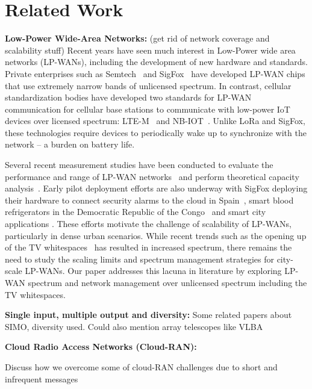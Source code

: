 \section{Related Work}
\label{sec:related-work}



\noindent \textbf{Low-Power Wide-Area Networks: } {\color{blue} (get rid of network coverage and scalability stuff)} Recent years have seen much
interest in Low-Power wide area networks (LP-WANs), including the development
of new hardware and standards. Private enterprises such as
Semtech~\cite{Sornin2015, LoRaWanAlliance2015} and
SigFox~\cite{sanchez2016state} have developed LP-WAN chips that use extremely
narrow bands of unlicensed spectrum. In contrast, cellular standardization
bodies have developed two standards for LP-WAN communication for cellular base
stations to communicate with low-power IoT devices over licensed spectrum:
LTE-M~\cite{GSMAssociation2016} and NB-IOT~\cite{Ratasuk2016}. Unlike LoRa and
SigFox, these technologies require devices to periodically wake up to
synchronize with the network -- a burden on battery life.

Several recent measurement studies have been conducted to evaluate the
performance and range of LP-WAN networks~\cite{petric2016measurements,
7499263, toldov2016performance} and perform theoretical capacity
analysis~\cite{mikhaylov2016analysis}. Early pilot deployment efforts are also
underway with SigFox deploying their hardware to connect security alarms to
the cloud in Spain~\cite{sanchez2016state}, smart blood refrigerators in the
Democratic Republic of the Congo~\cite{ramachandranmupnp} and smart city
applications \cite{centenaro2015long}. These efforts motivate the challenge of
scalability of LP-WANs, particularly in dense urban scenarios. While recent
trends such as the opening up of the TV whitespaces~\cite{FCC_Whitespaces} has
resulted in increased spectrum, there remains the need to study the scaling
limits and spectrum management strategies for city-scale LP-WANs. Our paper
addresses this lacuna in literature by exploring LP-WAN spectrum and network
management over unlicensed spectrum including the TV whitespaces.
\\\vspace*{-0.1in}

\noindent \textbf{Single input, multiple output and diversity: } Some related papers about SIMO, diversity used. Could also mention array telescopes like VLBA

\noindent \textbf{Cloud Radio Access Networks (Cloud-RAN): }

{\color{blue} Discuss how we overcome some of cloud-RAN challenges due to short and infrequent messages}